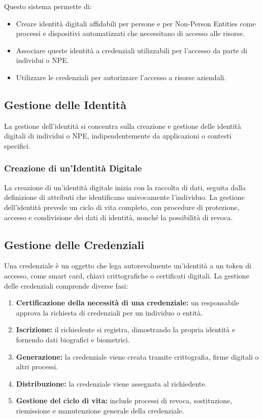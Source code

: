 Questo sistema permette di:

\begin{itemize}
    \item Creare identità digitali affidabili per persone e per Non-Person Entities come processi e dispositivi automatizzati che necessitano di accesso alle risorse.
    \item Associare queste identità a credenziali utilizzabili per l'accesso da parte di individui o NPE.
    \item Utilizzare le credenziali per autorizzare l'accesso a risorse aziendali.
\end{itemize}

\subsection{Gestione delle Identità}

La gestione dell'identità si concentra sulla creazione e gestione delle identità digitali di individui o NPE, indipendentemente da applicazioni o contesti specifici.

\subsubsection{Creazione di un'Identità Digitale}

La creazione di un'identità digitale inizia con la raccolta di dati, seguita dalla definizione di attributi che identificano univocamente l'individuo. La gestione dell'identità prevede un ciclo di vita completo, con procedure di protezione, accesso e condivisione dei dati di identità, nonché la possibilità di revoca.

\subsection{Gestione delle Credenziali}

Una credenziale è un oggetto che lega autorevolmente un'identità a un token di accesso, come smart card, chiavi crittografiche o certificati digitali. La gestione delle credenziali comprende diverse fasi:

\begin{enumerate}
    \item \textbf{Certificazione della necessità di una credenziale:} un responsabile approva la richiesta di credenziali per un individuo o entità.
    \item \textbf{Iscrizione:} il richiedente si registra, dimostrando la propria identità e fornendo dati biografici e biometrici.
    \item \textbf{Generazione:} la credenziale viene creata tramite crittografia, firme digitali o altri processi.
    \item \textbf{Distribuzione:} la credenziale viene assegnata al richiedente.
    \item \textbf{Gestione del ciclo di vita:} include processi di revoca, sostituzione, riemissione e manutenzione generale della credenziale.
\end{enumerate}

